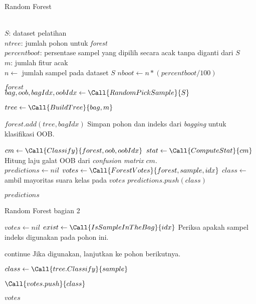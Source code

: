 \begin{algorithm}[h]
\caption{Random Forest}
\label{alg:rf}
	\begin{algorithmic}[1]
\Require \\
$ S $: dataset pelatihan \\
$ ntree $: jumlah pohon untuk \textit{forest} \\
$ percentboot $: persentase sampel yang dipilih secara acak tanpa diganti dari $S$ \\
$ m $: jumlah fitur acak \\

	\State $ n \gets $ jumlah sampel pada dataset $ S $
	\State $ nboot \gets n * (percentboot / 100) $
		\State {}
	\EndFor
	
	\State \Return $forest$
\EndFunction
\\
	\label{bagging}
	\State $ bag, oob, bagIdx, oobIdx \gets \Call{RandomPickSample}{S} $

	\State $ tree \gets \Call{BuildTree}{bag, m} $

	\State $ forest.add(tree, bagIdx) $
	\Comment Simpan pohon dan indeks dari \textit{bagging} untuk
	klasifikasi OOB.

	\State $ cm \gets \Call{Classify}{forest, oob, oobIdx} $
	\State $ stat \gets \Call{ComputeStat}{cm} $
	\Comment Hitung laju galat OOB dari \textit{confusion matrix}
	$cm$.
\EndFunction
\\
	\State $ predictions \gets nil $
		\State $ votes \gets \Call{ForestVotes}{forest, sample, idx} $
		\State $ class \gets $ ambil mayoritas suara kelas pada $votes$
		\State $ predictions.push(class) $
	\EndFor

	\State \Return $predictions$
\EndFunction
	\end{algorithmic}
\end{algorithm}

\begin{algorithm}[h]
	\caption{Random Forest bagian 2}
	\begin{algorithmic}[1]


	\State $ votes \gets nil $
		\State $ exist \gets \Call{IsSampleInTheBag}{idx} $
		\Comment Periksa apakah sampel indeks digunakan pada pohon ini.

			\State continue
			\Comment Jika digunakan, lanjutkan ke pohon berikutnya.
		\EndIf

		\State $ class \gets \Call{tree.Classify}{sample} $

		\State $ \Call{votes.push}{class} $
	\EndFor

	\State \Return $ votes $
\EndFunction
	\end{algorithmic}
\end{algorithm}
